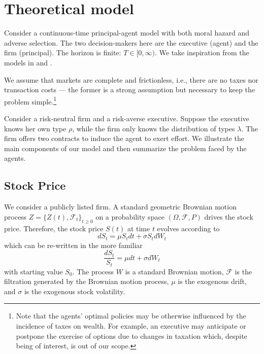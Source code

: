 \section{Theoretical model}

Consider a continuous-time principal-agent model with both moral hazard and adverse selection. The two decision-makers here are the executive (agent) and the firm (principal). The horizon is finite: $T \in [0, \infty)$.
We take inspiration from the models in \cite{sannikov2008continuous} and \cite{cadenillas2002executive}. 

We assume that markets are complete and frictionless, i.e., there are no taxes nor transaction costs --- the former is a strong assumption but necessary to keep the problem simple.\footnote{Note that the agents' optimal policies may be otherwise influenced by the incidence of taxes on wealth. For example, an executive may anticipate or postpone the exercise of options due to changes in taxation which, despite being of interest, is out of our scope.}

Consider a risk-neutral firm and a risk-averse executive. Suppose the executive knows her own type $\rho$, while the firm only knows the distribution of types $\lambda$. The firm offers two contracts to induce the agent to exert effort. We illustrate the main components of our model and then summarize the problem faced by the agents.


\subsection{Stock Price}
We consider a publicly listed firm. A standard geometric Brownian motion process $Z = \{ Z(t), \mathscr{F}_t \}_{t \ge 0}$ on a probability space $(\Omega, \mathscr{F}, P)$ drives the stock price. 
Therefore, the stock price $S(t)$ at time $t$ evolves according to 
$$ dS_t = \mu S_t dt + \sigma S_t dW_t $$
which can be re-written in the more familiar
$$ \frac{dS_t}{S_t} = \mu dt + \sigma dW_t $$
with starting value $S_0$. The process $W$ is a standard Brownian motion, $\mathscr{F}$ is the filtration generated by the Brownian motion process, $\mu$ is the exogenous drift, and $\sigma$ is the exogenous stock volatility. 

